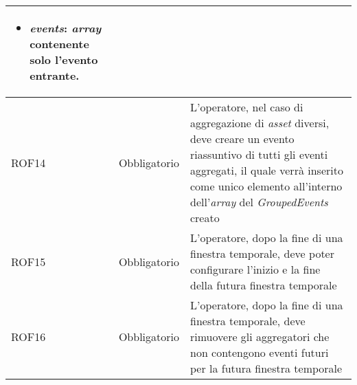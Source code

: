 {\begin{longtable}{L{3cm} L{3cm} L{7.5cm}}
\begin{itemize}
	\item{\textbf{\textit{events}:} \textit{array} contenente solo l'evento entrante.}
\end{itemize}\\
\hline
ROF14 & Obbligatorio & L'operatore, nel caso di aggregazione di \textit{asset} diversi, deve creare un evento riassuntivo di tutti gli eventi aggregati, il quale verrà inserito come unico elemento all'interno dell'\textit{array} del \textit{GroupedEvents} creato\\
\hline
ROF15 & Obbligatorio & L'operatore, dopo la fine di una finestra temporale, deve poter configurare l'inizio e la fine della futura finestra temporale\\
\hline
ROF16 & Obbligatorio & L'operatore, dopo la fine di una finestra temporale, deve rimuovere gli aggregatori che non contengono eventi futuri per la futura finestra temporale\\
\hline
\end{longtable}
}

